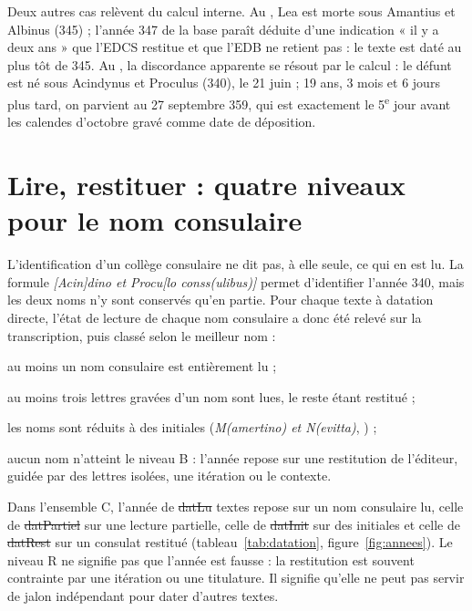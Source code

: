 Deux autres cas relèvent du calcul interne. Au , Lea est morte sous Amantius et Albinus (345) ; l’année 347 de la base paraît déduite d’une indication « il y a deux ans » que l’EDCS restitue et que l’EDB ne retient pas : le texte est daté au plus tôt de 345. Au , la discordance apparente se résout par le calcul : le défunt est né sous Acindynus et Proculus (340), le 21 juin ; 19 ans, 3 mois et 6 jours plus tard, on parvient au 27 septembre 359, qui est exactement le 5\textsuperscript{e} jour avant les calendes d’octobre gravé comme date de déposition.

\section{Lire, restituer : quatre niveaux pour le nom consulaire}

L’identification d’un collège consulaire ne dit pas, à elle seule, ce qui en est lu. La formule \emph{[Acin]dino et Procu[lo conss(ulibus)]} permet d’identifier l’année 340, mais les deux noms n’y sont conservés qu’en partie. Pour chaque texte à datation directe, l’état de lecture de chaque nom consulaire a donc été relevé sur la transcription, puis classé selon le meilleur nom :

\begin{description}[style=nextline,leftmargin=1.5em,font=\normalfont\scshape]
\item[A — nom lu] au moins un nom consulaire est entièrement lu ;
\item[B — lecture partielle] au moins trois lettres gravées d’un nom sont lues, le reste étant restitué ;
\item[C — initiales] les noms sont réduits à des initiales (\emph{M(amertino) et N(evitta)}, ) ;
\item[R — consulat restitué] aucun nom n’atteint le niveau B : l’année repose sur une restitution de l’éditeur, guidée par des lettres isolées, une itération ou le contexte.
\end{description}

Dans l’ensemble C, l’année de \st{datLu} textes repose sur un nom consulaire lu, celle de \st{datPartiel} sur une lecture partielle, celle de \st{datInit} sur des initiales et celle de \st{datRest} sur un consulat restitué (tableau~\ref{tab:datation}, figure~\ref{fig:annees}). Le niveau R ne signifie pas que l’année est fausse : la restitution est souvent contrainte par une itération ou une titulature. Il signifie qu’elle ne peut pas servir de jalon indépendant pour dater d’autres textes.

